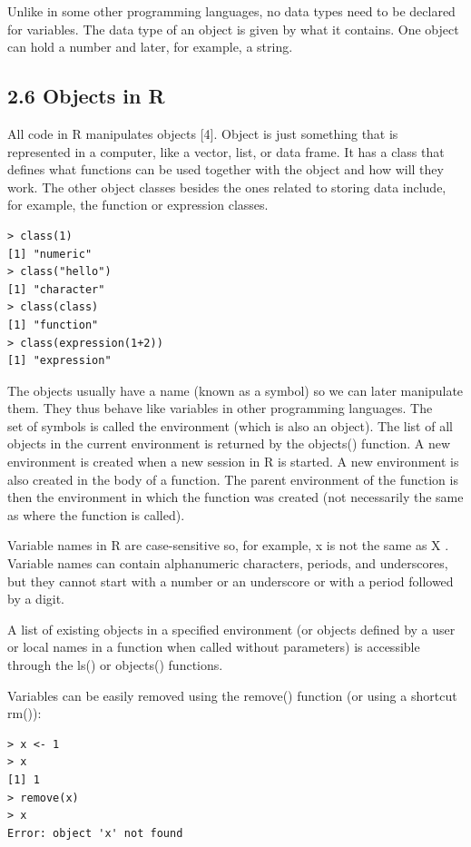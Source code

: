\documentclass[10pt]{book}
\begin{document}
Unlike in some other programming languages, no data types need to be declared for variables. The data type of an object is given by what it contains. One object can hold a number and later, for example, a string.

\subsection*{2.6 Objects in R}
All code in R manipulates objects [4]. Object is just something that is represented in a computer, like a vector, list, or data frame. It has a class that defines what functions can be used together with the object and how will they work. The other object classes besides the ones related to storing data include, for example, the function or expression classes.

\begin{verbatim}
> class(1)
[1] "numeric"
> class("hello")
[1] "character"
> class(class)
[1] "function"
> class(expression(1+2))
[1] "expression"
\end{verbatim}

The objects usually have a name (known as a symbol) so we can later manipulate them. They thus behave like variables in other programming languages. The\\
set of symbols is called the environment (which is also an object). The list of all objects in the current environment is returned by the objects() function. A new environment is created when a new session in R is started. A new environment is also created in the body of a function. The parent environment of the function is then the environment in which the function was created (not necessarily the same as where the function is called).

Variable names in R are case-sensitive so, for example, x is not the same as X . Variable names can contain alphanumeric characters, periods, and underscores, but they cannot start with a number or an underscore or with a period followed by a digit.

A list of existing objects in a specified environment (or objects defined by a user or local names in a function when called without parameters) is accessible through the ls() or objects() functions.

Variables can be easily removed using the remove() function (or using a shortcut rm()):

\begin{verbatim}
> x <- 1
> x
[1] 1
> remove(x)
> x
Error: object 'x' not found
\end{verbatim}
\end{document}

